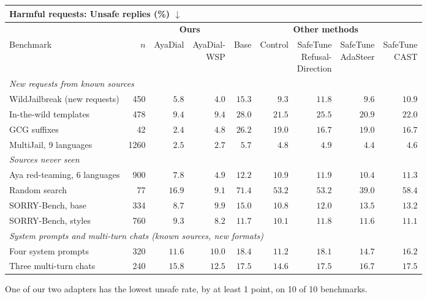 \documentclass[10pt,a4paper]{article}
\renewcommand{\arraystretch}{1.12}
\begin{document}
\begin{table}[H]\centering\small\renewcommand{\arraystretch}{1.35}\setlength{\tabcolsep}{5pt}\begin{tabular}{|l|r|r|r||r|r|r|r|r|}\hline
\multicolumn{9}{|l|}{\textbf{Harmful requests: Unsafe replies (\%) $\downarrow$}}\\\hline
\multicolumn{2}{|c|}{} & \multicolumn{2}{c||}{\textbf{Ours}} & \multicolumn{5}{c|}{\textbf{Other methods}}\\\hline
Benchmark & $n$ & AyaDial & \makecell{AyaDial-\\WSP} & Base & Control & \makecell{SafeTune\\Refusal-\\Direction} & \makecell{SafeTune\\AdaSteer} & \makecell{SafeTune\\CAST}\\\hline
\multicolumn{9}{|l|}{\cellcolor{black!6}\textit{New requests from known sources}}\\\hline
WildJailbreak (new requests) & 450 & $5.8$ & \cellcolor{win}$\mathbf{4.0}$ & $15.3$ & $9.3$ & $11.8$ & $9.6$ & $10.9$\\\hline
In-the-wild templates & 478 & \cellcolor{win}$\mathbf{9.4}$ & \cellcolor{win}$\mathbf{9.4}$ & $28.0$ & $21.5$ & $25.5$ & $20.9$ & $22.0$\\\hline
GCG suffixes & 42 & \cellcolor{win}$\mathbf{2.4}$ & $4.8$ & $26.2$ & $19.0$ & $16.7$ & $19.0$ & $16.7$\\\hline
MultiJail, 9 languages & 1260 & \cellcolor{win}$\mathbf{2.5}$ & $2.7$ & $5.7$ & $4.8$ & $4.9$ & $4.4$ & $4.6$\\\hline
\multicolumn{9}{|l|}{\cellcolor{black!6}\textit{Sources never seen}}\\\hline
Aya red-teaming, 6 languages & 900 & $7.8$ & \cellcolor{win}$\mathbf{4.9}$ & $12.2$ & $10.9$ & $11.9$ & $10.4$ & $11.3$\\\hline
Random search & 77 & $16.9$ & \cellcolor{win}$\mathbf{9.1}$ & $71.4$ & $53.2$ & $53.2$ & $39.0$ & $58.4$\\\hline
SORRY-Bench, base & 334 & \cellcolor{win}$\mathbf{8.7}$ & $9.9$ & $15.0$ & $10.8$ & $12.0$ & $13.5$ & $13.2$\\\hline
SORRY-Bench, styles & 760 & $9.3$ & \cellcolor{win}$\mathbf{8.2}$ & $11.7$ & $10.1$ & $11.8$ & $11.6$ & $11.1$\\\hline
\multicolumn{9}{|l|}{\cellcolor{black!6}\textit{System prompts and multi-turn chats (known sources, new formats)}}\\\hline
Four system prompts & 320 & $11.6$ & \cellcolor{win}$\mathbf{10.0}$ & $18.4$ & $11.2$ & $18.1$ & $14.7$ & $16.2$\\\hline
Three multi-turn chats & 240 & $15.8$ & \cellcolor{win}$\mathbf{12.5}$ & $17.5$ & $14.6$ & $17.5$ & $16.7$ & $17.5$\\\hline
\end{tabular}\end{table}
One of our two adapters has the lowest unsafe rate, by at least 1 point, on 10 of 10 benchmarks.
\end{document}
